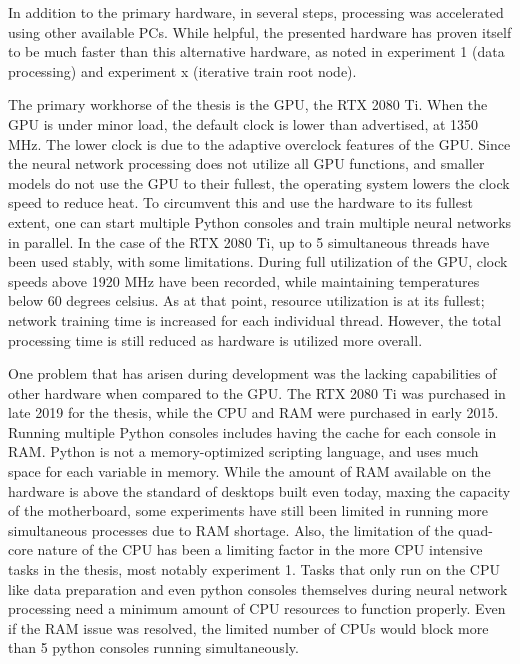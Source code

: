 In addition to the primary hardware, in several steps, processing was accelerated using other available PCs.
While helpful, the presented hardware has proven itself to be much faster than this alternative hardware, as noted in experiment 1 (data processing) and experiment x (iterative train root node). %

The primary workhorse of the thesis is the GPU, the RTX 2080 Ti\cite{rtx2080}.
When the GPU is under minor load, the default clock is lower than advertised, at 1350 MHz.
The lower clock is due to the adaptive overclock features of the GPU.
Since the neural network processing does not utilize all GPU functions, and smaller models do not use the GPU to their fullest, the operating system lowers the clock speed to reduce heat.
To circumvent this and use the hardware to its fullest extent, one can start multiple Python consoles and train multiple neural networks in parallel.
In the case of the RTX 2080 Ti, up to 5 simultaneous threads have been used stably, with some limitations.
During full utilization of the GPU, clock speeds above 1920 MHz have been recorded, while maintaining temperatures below 60 degrees celsius.
As at that point, resource utilization is at its fullest; network training time is increased for each individual thread. 
However, the total processing time is still reduced as hardware is utilized more overall.

One problem that has arisen during development was the lacking capabilities of other hardware when compared to the GPU.
The RTX 2080 Ti was purchased in late 2019 for the thesis, while the CPU and RAM were purchased in early 2015.
Running multiple Python consoles includes having the cache for each console in RAM.
Python is not a memory-optimized scripting language, and uses much space for each variable in memory\cite{theano:memory}.
While the amount of RAM available on the hardware is above the standard of desktops built even today, maxing the capacity of the motherboard, some experiments have still been limited in running more simultaneous processes due to RAM shortage.
Also, the limitation of the quad-core nature of the CPU has been a limiting factor in the more CPU intensive tasks in the thesis, most notably experiment 1.%
Tasks that only run on the CPU like data preparation and even python consoles themselves during neural network processing need a minimum amount of CPU resources to function properly.
Even if the RAM issue was resolved, the limited number of CPUs would block more than 5 python consoles running simultaneously.

